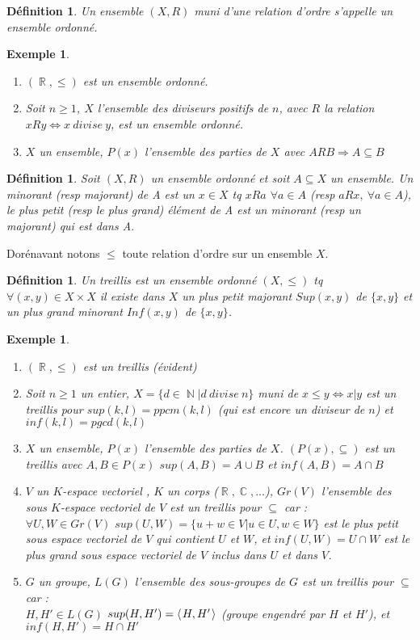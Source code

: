 \documentclass[a4paper, oneside]{report}
\theoremstyle{break}
\newtheorem{defi}[thm]{Définition}
\newtheorem{exem}[thm]{Exemple}
\newcommand{\sev}{sous espace vectoriel }
\newcommand{\ev}{espace vectoriel }
\newcommand{\x}{\times}
\DeclareMathOperator{\R}{\mathbb{R}}
\DeclareMathOperator{\N}{\mathbb{N}}
\DeclareMathOperator{\C}{\mathbb{C}}
\newcommand{\pro}[1]{\langle\hspace{0.1em}#1\hspace{0.1em}\rangle}
\begin{document}
\begin{defi}
	Un ensemble $(X,R)$ muni d'une relation d'ordre s'appelle un ensemble ordonné.
\end{defi}

\begin{exem}
	\begin{enumerate}
		\item $(\R,\leq )$ est un ensemble ordonné.
		\item Soit $n\geq 1$, $X$ l'ensemble des diviseurs positifs de $n$, avec $R$ la relation $xRy \Leftrightarrow x~divise~y$, est un ensemble ordonné.\\
		\item $X$ un ensemble, $P(x)$ l'ensemble des parties de $X$ avec $ARB\Rightarrow A\subseteq B$
	\end{enumerate}	
\end{exem}

\begin{defi}
	Soit $(X,R)$ un ensemble ordonné et soit $A\subseteq X$ un ensemble. Un minorant (resp majorant) de A est un $x\in X$ tq $xRa$ $\forall a \in A$ (resp $aRx,~\forall a\in A$), le plus petit (resp le plus grand) élément de A est un minorant (resp un majorant) qui est dans A.
\end{defi}

Dorénavant notons $\leq $ toute relation d'ordre sur un ensemble $X$.

\begin{defi}
	Un treillis est un ensemble ordonné $(X, \leq )$ tq $\forall (x,y)\in X\x X$ il existe dans $X$ un plus petit majorant $Sup(x,y)$ de $\{x,y\}$ et un plus grand minorant $Inf(x,y)$ de $\{x,y\}$.
\end{defi}

\begin{exem}
	\begin{enumerate}
		\item $(\R , \leq)$ est un treillis (évident)
		\item Soit $n\geq 1$ un entier, $X=\{d\in \N | d~divise~n \}$ muni de $x\leq y \Leftrightarrow x|y$ est un treillis pour $sup(k,l)=ppcm(k,l)$ (qui est encore un diviseur de $n$) et $inf(k,l)=pgcd(k,l)$
		\item $X$ un ensemble, $P(x)$ l'ensemble des parties de $X$. $(P(x),\subseteq)$ est un treillis avec $A,B\in P(x)$ $sup(A,B)=A\cup B$ et $inf(A,B)=A\cap B$
		\item $V$ un $K$-\ev, $K$ un corps ($\R,\C,...$), $Gr(V)$ l'ensemble des sous $K$-\ev de $V$ est un treillis pour $\subseteq$ car :\\
		$\forall U,W\in Gr(V)$ $sup(U,W)=\{u+w\in V |u\in U,w\in W \}$ est le plus petit \sev de $V$ qui contient $U$ et $W$, et $inf(U,W)=U\cap W$ est le plus grand \sev de $V$ inclus dans $U$ et dans $V$.\\
		\item $G$ un groupe, $L(G)$ l'ensemble des sous-groupes de $G$ est un treillis pour $\subseteq$ car :\\
		$H,H'\in L(G)$ $sup(H,H')=\pro{H,H'}$ (groupe engendré par $H$ et $H'$), et $inf(H,H')=H\cap H'$
	\end{enumerate}
\end{exem}
\end{document}
